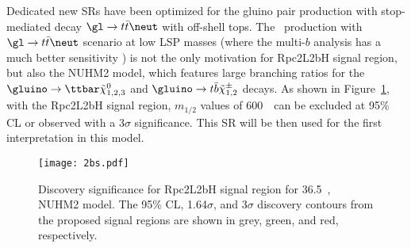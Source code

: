 

Dedicated new SRs have been optimized for the gluino pair production with stop-mediated decay $\gl\to t\bar t\neut$ with off-shell tops.
The \glgl\ production with $\gl\to t\bar t\neut$ scenario at low LSP masses (where the multi-$b$ analysis has a much better sensitivity
\cite{ATLAS-CONF-2017-021}) is not the only motivation for Rpc2L2bH signal region, but also the NUHM2 model, which features large branching ratios for the $\gluino\to\ttbar\tilde{\chi}_{1,2,3}^0$ and $\gluino\to t\bar{b}\tilde{\chi}_{1,2}^\pm$ decays. 
As shown in Figure~\ref{fig:SR_nuhm}, with the Rpc2L2bH signal region,  $m_{1/2}$ values of 600~\GeV~can be excluded at 95\% CL or observed with a 3$\sigma$ significance.
This SR will be then used for the first interpretation in this model.
\begin{figure}[htb!]
\centering
\texttt{[image: 2bs.pdf]}
\caption{Discovery significance for Rpc2L2bH signal region for 36.5~\ifb, NUHM2 model. The 95\% CL, 1.64$\sigma$, and 3$\sigma$ discovery contours from the proposed signal regions are shown in grey, green, and red, respectively.
}
\label{fig:SR_nuhm}
\end{figure}



